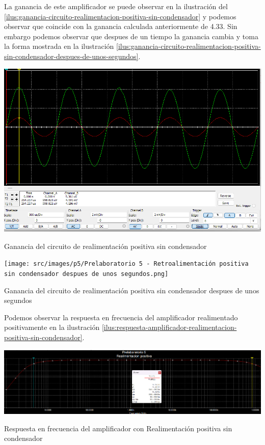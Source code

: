 La ganancia de este amplificador se puede observar en la ilustración del \ref{ilus:ganancia-circuito-realimentacion-positiva-sin-condensador} y podemos observar que coincide con la ganancia calculada anteriormente de 4.33. Sin embargo podemos observar que despues de un tiempo la ganancia cambia y toma la forma mostrada en la ilustración \ref{ilus:ganancia-circuito-realimentacion-positiva-sin-condensador-despues-de-unos-segundos}.

\begin{ilustracion}[ht]
    \centering
    \includegraphics[width=\textwidth]{src/images/p5/Prelaboratorio 5 - Realimentacion positiva sin condensador - ganancia.png}
    \caption{Ganancia del circuito de realimentación positiva sin condensador}
    \label{ilus:ganancia-circuito-realimentacion-positiva-sin-condensador}
\end{ilustracion}
\FloatBarrier


\begin{ilustracion}[ht]
    \centering
    \texttt{[image: src/images/p5/Prelaboratorio 5 - Retroalimentación positiva sin condensador despues de unos segundos.png]}
    \caption{Ganancia del circuito de realimentación positiva sin condensador despues de unos segundos}
    \label{ilus:ganancia-circuito-realimentacion-positiva-sin-condensador-despues-de-unos-segundos}
\end{ilustracion}
\FloatBarrier

Podemos observar la respuesta en frecuencia del amplificador realimentado positivamente en la ilustración \ref{ilus:respuesta-amplificador-realimentacion-positiva-sin-condensador}.

\begin{ilustracion}[ht]
    \centering
    \includegraphics[width=\textwidth]{src/images/p5/Prelaboratorio 5 - realimentacion positiva sin condensador - respuesta en frecuencia.png}
    \caption{Respuesta en frecuencia del amplificador con Realimentación positiva sin condensador} 
    \label{ilus:respuesta-amplificador-realimentacion-positiva-sin-condensador}
\end{ilustracion}

